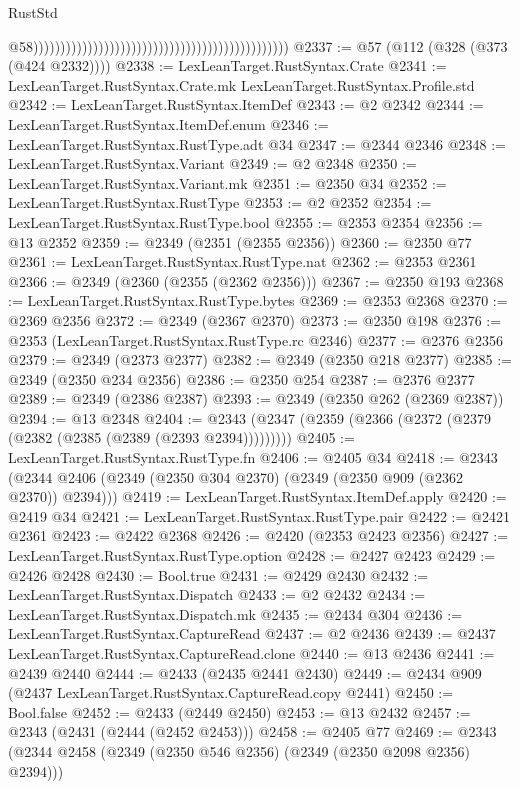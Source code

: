 \begin{lexlean}{RustStd}
\begin{coremodule}
{\begin{coremodule}
{{{{{{{{{{{{{{{{{{{{{{{{{{{{{{{{{{{{{{{{{{{{{{{{{{{{{{{                                                                                                  @58)))))))))))))))))))))))))))))))))))))))))))))))
@2337 := @57 (@112 (@328 (@373 (@424 @2332))))
@2338 := LexLeanTarget.RustSyntax.Crate
@2341 := LexLeanTarget.RustSyntax.Crate.mk LexLeanTarget.RustSyntax.Profile.std
@2342 := LexLeanTarget.RustSyntax.ItemDef
@2343 := @2 @2342
@2344 := LexLeanTarget.RustSyntax.ItemDef.enum
@2346 := LexLeanTarget.RustSyntax.RustType.adt @34
@2347 := @2344 @2346
@2348 := LexLeanTarget.RustSyntax.Variant
@2349 := @2 @2348
@2350 := LexLeanTarget.RustSyntax.Variant.mk
@2351 := @2350 @34
@2352 := LexLeanTarget.RustSyntax.RustType
@2353 := @2 @2352
@2354 := LexLeanTarget.RustSyntax.RustType.bool
@2355 := @2353 @2354
@2356 := @13 @2352
@2359 := @2349 (@2351 (@2355 @2356))
@2360 := @2350 @77
@2361 := LexLeanTarget.RustSyntax.RustType.nat
@2362 := @2353 @2361
@2366 := @2349 (@2360 (@2355 (@2362 @2356)))
@2367 := @2350 @193
@2368 := LexLeanTarget.RustSyntax.RustType.bytes
@2369 := @2353 @2368
@2370 := @2369 @2356
@2372 := @2349 (@2367 @2370)
@2373 := @2350 @198
@2376 := @2353 (LexLeanTarget.RustSyntax.RustType.rc @2346)
@2377 := @2376 @2356
@2379 := @2349 (@2373 @2377)
@2382 := @2349 (@2350 @218 @2377)
@2385 := @2349 (@2350 @234 @2356)
@2386 := @2350 @254
@2387 := @2376 @2377
@2389 := @2349 (@2386 @2387)
@2393 := @2349 (@2350 @262 (@2369 @2387))
@2394 := @13 @2348
@2404 := @2343 (@2347 (@2359 (@2366 (@2372 (@2379 (@2382 (@2385 (@2389 (@2393 @2394)))))))))
@2405 := LexLeanTarget.RustSyntax.RustType.fn
@2406 := @2405 @34
@2418 := @2343 (@2344 @2406 (@2349 (@2350 @304 @2370) (@2349 (@2350 @909 (@2362 @2370)) @2394)))
@2419 := LexLeanTarget.RustSyntax.ItemDef.apply
@2420 := @2419 @34
@2421 := LexLeanTarget.RustSyntax.RustType.pair
@2422 := @2421 @2361
@2423 := @2422 @2368
@2426 := @2420 (@2353 @2423 @2356)
@2427 := LexLeanTarget.RustSyntax.RustType.option
@2428 := @2427 @2423
@2429 := @2426 @2428
@2430 := Bool.true
@2431 := @2429 @2430
@2432 := LexLeanTarget.RustSyntax.Dispatch
@2433 := @2 @2432
@2434 := LexLeanTarget.RustSyntax.Dispatch.mk
@2435 := @2434 @304
@2436 := LexLeanTarget.RustSyntax.CaptureRead
@2437 := @2 @2436
@2439 := @2437 LexLeanTarget.RustSyntax.CaptureRead.clone
@2440 := @13 @2436
@2441 := @2439 @2440
@2444 := @2433 (@2435 @2441 @2430)
@2449 := @2434 @909 (@2437 LexLeanTarget.RustSyntax.CaptureRead.copy @2441)
@2450 := Bool.false
@2452 := @2433 (@2449 @2450)
@2453 := @13 @2432
@2457 := @2343 (@2431 (@2444 (@2452 @2453)))
@2458 := @2405 @77
@2469 := @2343 (@2344 @2458 (@2349 (@2350 @546 @2356) (@2349 (@2350 @2098 @2356) @2394)))
}}}}}}}}}}}}}}}}}}}}}}}}}}}}}}}}}}}}}}}}}}}}}}}}}}}}}}}
\end{coremodule}}
\end{coremodule}
\end{lexlean}
